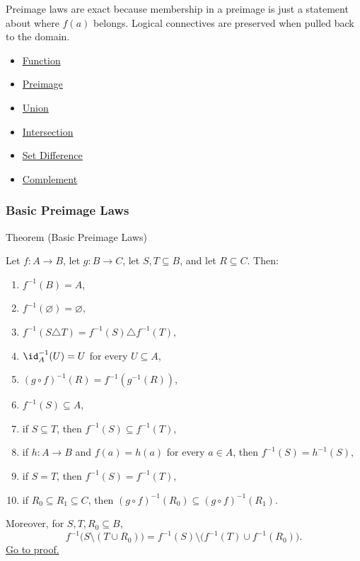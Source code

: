 \begin{remark*}[Interpretation]
Preimage laws are exact because membership in a preimage is just a statement
about where $f(a)$ belongs. Logical connectives are preserved when pulled back
to the domain.
\end{remark*}

\begin{dependencies}
\begin{itemize}
  \item \hyperref[def:function]{Function}
  \item \hyperref[def:preimage]{Preimage}
  \item \hyperref[def:union]{Union}
  \item \hyperref[def:intersection]{Intersection}
  \item \hyperref[def:set-difference]{Set Difference}
  \item \hyperref[def:complement]{Complement}
\end{itemize}
\end{dependencies}

\subsubsection*{Basic Preimage Laws}

\begin{theorembox}{Theorem (Basic Preimage Laws)}
\begin{theorem}\label{thm:basic-preimage-laws}
Let $f:A\to B$, let $g:B\to C$, let $S,T\subseteq B$, and let $R\subseteq C$.
Then:
\begin{enumerate}[label=(\roman*)]
\item $f^{-1}(B)=A$,
\item $f^{-1}(\varnothing)=\varnothing$,
\item $f^{-1}(S\triangle T)=f^{-1}(S)\triangle f^{-1}(T)$,
\item $\id_A^{-1}(U)=U$ for every $U\subseteq A$,
\item $(g\circ f)^{-1}(R)=f^{-1}(g^{-1}(R))$,
\item $f^{-1}(S)\subseteq A$,
\item if $S\subseteq T$, then $f^{-1}(S)\subseteq f^{-1}(T)$,
\item if $h:A\to B$ and $f(a)=h(a)$ for every $a\in A$, then
      $f^{-1}(S)=h^{-1}(S)$,
\item if $S=T$, then $f^{-1}(S)=f^{-1}(T)$,
\item if $R_0\subseteq R_1\subseteq C$, then
      $(g\circ f)^{-1}(R_0)\subseteq (g\circ f)^{-1}(R_1)$.
\end{enumerate}
Moreover, for $S,T,R_0\subseteq B$,
\[
f^{-1}\!\bigl(S\setminus (T\cup R_0)\bigr)
=
f^{-1}(S)\setminus \bigl(f^{-1}(T)\cup f^{-1}(R_0)\bigr).
\]
\hyperref[prf:basic-preimage-laws]{Go to proof.}
\end{theorem}
\end{theorembox}

